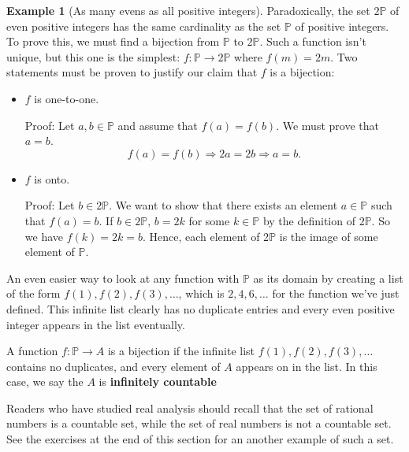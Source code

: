 \documentclass[10pt,]{book}
\newcommand{\terminology}[1]{\textbf{#1}}
\theoremstyle{plain}
\theoremstyle{definition}
\theoremstyle{definition}
\newtheorem{example}[theorem]{Example}
\theoremstyle{definition}
\begin{document}
\begin{example}[As many evens as all positive integers]\label{ex-evens-eq-all}
Paradoxically, the set \(2\mathbb{P}\) of even positive integers has the same cardinality as the set \(\mathbb{P}\) of positive integers. To prove this, we must find a bijection from \(\mathbb{P}\) to \(2\mathbb{P}\).  Such a function isn't unique, but this one is the simplest: \(f:\mathbb{P} \rightarrow  2\mathbb{P}\) where \(f(m) = 2m\).  Two statements must be proven to justify our claim that \(f\) is a bijection:%
\par
\leavevmode%
\begin{itemize}[label=\textbullet]
\item{} \(f\) is one-to-one.%
\par
Proof: Let \(a, b \in  \mathbb{P}\) and assume that \(f(a) = f(b)\). We must prove that \(a = b\). 
\begin{equation*} f(a) = f(b) \Longrightarrow  2a = 2b \Longrightarrow  a = b.\end{equation*} %
\item{}\( f \) is onto.%
\par
Proof:  Let \(b \in  2\mathbb{P}\). We want to show that there exists an element \(a \in  \mathbb{P}\) such that \(f(a) = b\). If \(b \in 
2\mathbb{P}\), \(b = 2k\) for some \(k \in  \mathbb{P}\) by the definition of \(2\mathbb{P}\). So we have \(f(k) = 2k = b\). Hence, each element
of 2\(\mathbb{P}\) is the image of some element of \(\mathbb{P}\). %
\end{itemize}
%
\end{example}
\par
An even easier way to look at any function with \(\mathbb{P}\) as its domain by creating a list of the form \(f(1),f(2), f(3), \ldots\), which is \(2, 4, 6, \ldots\) for the function we've just defined.  This infinite list clearly has no duplicate entries and every even positive integer
appears in the list eventually.%
\par
A function \(f:\mathbb{P}\to A\) is a bijection if the infinite list \(f(1), f(2), f(3), \ldots\) contains no duplicates, and every element of \(A\) appears on in the list.  In this case, we say the \(A\) is \terminology{infinitely countable}%
\par
Readers who have studied real analysis should recall that the set of rational numbers is a countable set, while the set of real numbers is not a
countable set. See the exercises at the end of this section for an another example of such a set.%
\par
\end{document}

